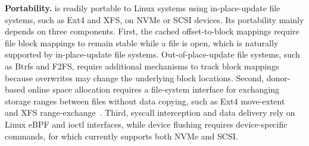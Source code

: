{\bf Portability.} \odes is readily portable to Linux systems using in-place-update file systems, such as Ext4 and XFS, on NVMe or SCSI devices. Its portability mainly depends on three components. First, the cached offset-to-block mappings require file block mappings to remain stable while a file is open, which is naturally supported by in-place-update file systems. Out-of-place-update file systems, such as Btrfs and F2FS, require additional mechanisms to track block mappings because overwrites may change the underlying block locations. Second, donor-based online space allocation requires a file-system interface for exchanging storage ranges between files without data copying, such as Ext4 move-extent~\cite{ext4moveextent} and XFS range-exchange~\cite{xfs-exchange-range}. Third, syscall interception and data delivery rely on Linux eBPF and ioctl interfaces, while device flushing requires device-specific commands, for which \odes currently supports both NVMe and SCSI. 



